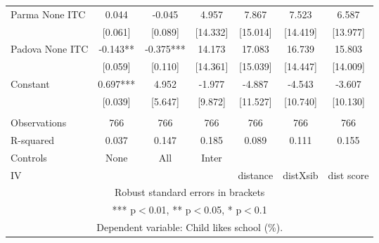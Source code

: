 \begin{tabular}{lcccccc}
Parma None ITC & 0.044 & -0.045 & 4.957 & 7.867 & 7.523 & 6.587 \\
 & [0.061] & [0.089] & [14.332] & [15.014] & [14.419] & [13.977] \\
Padova None ITC & -0.143** & -0.375*** & 14.173 & 17.083 & 16.739 & 15.803 \\
 & [0.059] & [0.110] & [14.361] & [15.039] & [14.447] & [14.009] \\
Constant & 0.697*** & 4.952 & -1.977 & -4.887 & -4.543 & -3.607 \\
 & [0.039] & [5.647] & [9.872] & [11.527] & [10.740] & [10.130] \\
 &  &  &  &  &  &  \\
Observations & 766 & 766 & 766 & 766 & 766 & 766 \\
R-squared & 0.037 & 0.147 & 0.185 & 0.089 & 0.111 & 0.155 \\
Controls & None & All & Inter &  &  &  \\
 IV &  &  &  & distance & distXsib & dist score \\ \hline
\multicolumn{7}{c}{ Robust standard errors in brackets} \\
\multicolumn{7}{c}{ *** p$<$0.01, ** p$<$0.05, * p$<$0.1} \\
\multicolumn{7}{c}{ Dependent variable: Child likes school (\%).} \\
\end{tabular}
